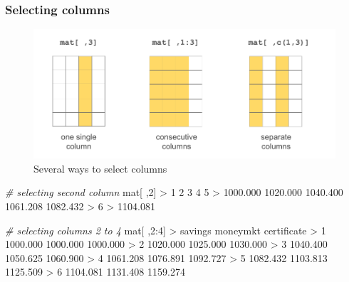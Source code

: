\documentclass[
]{book}
\newenvironment{Shaded}{\begin{snugshade}}{\end{snugshade}}
\newcommand{\CommentTok}[1]{\textcolor[rgb]{0.56,0.35,0.01}{\textit{#1}}}
\newcommand{\DecValTok}[1]{\textcolor[rgb]{0.00,0.00,0.81}{#1}}
\newcommand{\FloatTok}[1]{\textcolor[rgb]{0.00,0.00,0.81}{#1}}
\newcommand{\NormalTok}[1]{#1}
\newcommand{\SpecialCharTok}[1]{\textcolor[rgb]{0.00,0.00,0.00}{#1}}
\begin{document}
\hypertarget{selecting-columns}{%
\subsubsection*{Selecting columns}\label{selecting-columns}}

\begin{figure}

{\centering \includegraphics[width=0.8\linewidth]{images/objects/obj-matrix-cols1} 

}

\caption{Several ways to select columns}\label{fig:unnamed-chunk-132}
\end{figure}

\begin{Shaded}
\begin{Highlighting}[]
\CommentTok{\# selecting second column}
\NormalTok{mat[ ,}\DecValTok{2}\NormalTok{]}
\SpecialCharTok{\textgreater{}}        \DecValTok{1}        \DecValTok{2}        \DecValTok{3}        \DecValTok{4}        \DecValTok{5} 
\SpecialCharTok{\textgreater{}} \FloatTok{1000.000} \FloatTok{1020.000} \FloatTok{1040.400} \FloatTok{1061.208} \FloatTok{1082.432} 
\SpecialCharTok{\textgreater{}}        \DecValTok{6} 
\SpecialCharTok{\textgreater{}} \FloatTok{1104.081}

\CommentTok{\# selecting columns 2 to 4}
\NormalTok{mat[ ,}\DecValTok{2}\SpecialCharTok{:}\DecValTok{4}\NormalTok{]}
\SpecialCharTok{\textgreater{}}\NormalTok{    savings moneymkt certificate}
\SpecialCharTok{\textgreater{}} \DecValTok{1} \FloatTok{1000.000} \FloatTok{1000.000}    \FloatTok{1000.000}
\SpecialCharTok{\textgreater{}} \DecValTok{2} \FloatTok{1020.000} \FloatTok{1025.000}    \FloatTok{1030.000}
\SpecialCharTok{\textgreater{}} \DecValTok{3} \FloatTok{1040.400} \FloatTok{1050.625}    \FloatTok{1060.900}
\SpecialCharTok{\textgreater{}} \DecValTok{4} \FloatTok{1061.208} \FloatTok{1076.891}    \FloatTok{1092.727}
\SpecialCharTok{\textgreater{}} \DecValTok{5} \FloatTok{1082.432} \FloatTok{1103.813}    \FloatTok{1125.509}
\SpecialCharTok{\textgreater{}} \DecValTok{6} \FloatTok{1104.081} \FloatTok{1131.408}    \FloatTok{1159.274}
\end{Highlighting}
\end{Shaded}
\end{document}
